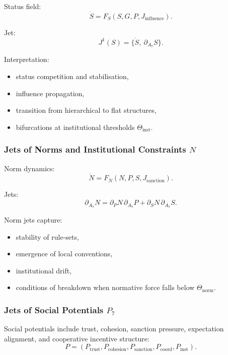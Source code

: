 Status field:
\[
\dot{S}=F_S(S,G,P,J_{\mathrm{influence}}).
\]

Jet:
\[
J^1(S)=\{\dot{S},\ \partial_{A_7}S\}.
\]

Interpretation:
\begin{itemize}
    \item status competition and stabilisation,
    \item influence propagation,
    \item transition from hierarchical to flat structures,
    \item bifurcations at institutional thresholds $\Theta_{\mathrm{inst}}$.
\end{itemize}


\subsubsection{Jets of Norms and Institutional Constraints \texorpdfstring{$N$}{N}}

Norm dynamics:
\[
\dot{N} = F_N(N,P,S,J_{\mathrm{sanction}}).
\]

Jets:
\[
\partial_{A_7}N 
= 
\partial_P N\, \partial_{A_7}P
+
\partial_S N\, \partial_{A_7}S.
\]

Norm jets capture:
\begin{itemize}
    \item stability of rule-sets,
    \item emergence of local conventions,
    \item institutional drift,
    \item conditions of breakdown when normative force falls below
          $\Theta_{\mathrm{norm}}$.
\end{itemize}


\subsubsection{Jets of Social Potentials \texorpdfstring{$P_7$}{P_7}}

Social potentials include trust, cohesion, sanction pressure, expectation
alignment, and cooperative incentive structure:
\[
P = (P_{\mathrm{trust}}, P_{\mathrm{cohesion}}, P_{\mathrm{sanction}},
P_{\mathrm{coord}}, P_{\mathrm{inst}}).
\]

